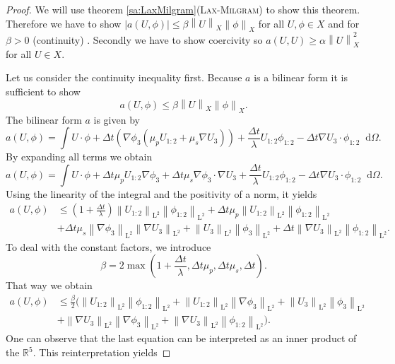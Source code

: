 \documentclass[12pt,a4paper,twoside, open=right]{scrreprt}
\theoremstyle{definition}
\theoremstyle{plain}
\newcommand{\abs}[1]{\left\vert #1\right\vert}
\newcommand{\rr}{\mathbb{R}}
\newcommand{\norm}[1]{\left\lVert#1\right\rVert}
\newcommand{\ltnorm}[1]{\norm{#1}_{\mathrm{L}^2}}
\newcommand{\D}{\mathop{}\!\mathrm{d}}
\begin{document}
\begin{proof}
    We will use theorem \ref{sa:LaxMilgram}(\textsc{Lax-Milgram}) to show this theorem. Therefore we have to show $\abs{a(U,\phi)}\le \beta\norm{U}_X\norm{\phi}_X$ for all $U,\phi\in X$ and for $\beta >0$ (continuity) . Secondly we have to show coercivity so $a(U,U)\ge \alpha\norm{U}^2_X$ for all $U\in X$. \par 
    Let us consider the continuity inequality first. Because $a$ is a bilinear form it is sufficient to show 
    \begin{equation}
        a(U,\phi)\le\beta\norm{U}_X\norm{\phi}_X.
    \end{equation}
    The bilinear form $a$ is given by
    \begin{equation}
        a(U,\phi)=\int U\cdot\phi +\Delta t(\nabla\phi_3(\mu_pU_{1:2}+\mu_s\nabla U_3))+\frac{\Delta t}{\lambda}U_{1:2}\phi_{1:2}-\Delta t\nabla U_3\cdot \phi_{1:2}\D\Omega.
    \end{equation}
    By expanding all terms we obtain
    \begin{equation}
        a(U,\phi)=\int U\cdot\phi +\Delta t\mu_pU_{1:2}\nabla\phi_3+\Delta t\mu_s\nabla \phi_3\cdot\nabla U_3+\frac{\Delta t}{\lambda}U_{1:2}\phi_{1:2}-\Delta t\nabla U_3\cdot\phi_{1:2}\D\Omega.
    \end{equation}
    Using the linearity of the integral and the positivity of a norm, it yields
    \begin{align}
        a(U,\phi)&\le \left(1+\frac{\Delta t}{\lambda}\right)\ltnorm{U_{1:2}}\ltnorm{\phi_{1:2}}+\Delta t\mu_p\ltnorm{U_{1:2}}\ltnorm{\phi_{1:2}}\\&+\Delta t\mu_s\ltnorm{\nabla\phi_3}\ltnorm{\nabla U_3}+\ltnorm{U_3}\ltnorm{\phi_3}+\Delta t\ltnorm{\nabla U_3}\ltnorm{\phi_{1:2}}.
    \end{align}
    To deal with the constant factors, we introduce 
    \begin{equation}
        \beta=2\max\left(1+\frac{\Delta t}{\lambda}, \Delta t\mu_p,\Delta t\mu_s,\Delta t\right).
    \end{equation}
    That way we obtain
    \begin{align}
        a(U,\phi)&\le \frac{\beta}{2}\big(\ltnorm{U_{1:2}}\ltnorm{\phi_{1:2}}+\ltnorm{U_{1:2}}\ltnorm{\nabla\phi_3}+\ltnorm{U_3}\ltnorm{\phi_3}\\&+\ltnorm{\nabla U_3}\ltnorm{\nabla\phi_3}+\ltnorm{\nabla U_3}\ltnorm{\phi_{1:2}}\big).
    \end{align}
    One can observe that the last equation can be interpreted as an inner product of the $\rr^5$. This reinterpretation yields

\end{proof}
\end{document}
